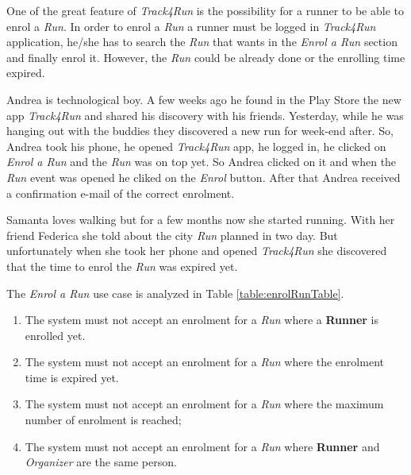 One of the great feature of \textit{Track4Run} is the possibility for a runner to be able to enrol a \textit{Run}.
In order to enrol a \textit{Run} a runner must be logged in \textit{Track4Run} application, he/she has to search the \textit{Run} that wants in the \textit{Enrol a Run} section and finally enrol it.
However, the \textit{Run} could be already done or the enrolling time expired.

Andrea is technological boy. A few weeks ago he found in the Play Store the new app \textit{Track4Run} and shared his discovery with his friends. Yesterday, while he was hanging out with the buddies they discovered a new run for week-end after.
So, Andrea took his phone, he opened \textit{Track4Run} app, he logged in, he clicked on \textit{Enrol a Run} and the \textit{Run} was on top yet. So Andrea clicked on it and when the \textit{Run} event was opened he cliked on the \textit{Enrol} button.
After that Andrea received a confirmation e-mail of the correct enrolment.

Samanta loves walking but for a few months now she started running. With her friend Federica she told about the city \textit{Run} planned in two day.
But unfortunately when she took her phone and opened \textit{Track4Run} she discovered that the time to enrol the \textit{Run} was expired yet.

The \textit{Enrol a Run} use case is analyzed in Table \ref{table:enrolRunTable}.

\begin{enumerate}
  \item The system must not accept an enrolment for a \textit{Run} where a \textbf{Runner} is enrolled yet.
  \item The system must not accept an enrolment for a \textit{Run} where the enrolment time is expired yet.
  \item The system must not accept an enrolment for a \textit{Run} where the maximum number of enrolment is reached;
  \item The system must not accept an enrolment for a \textit{Run} where \textbf{Runner} and \textit{Organizer} are the same person.
\end{enumerate}

